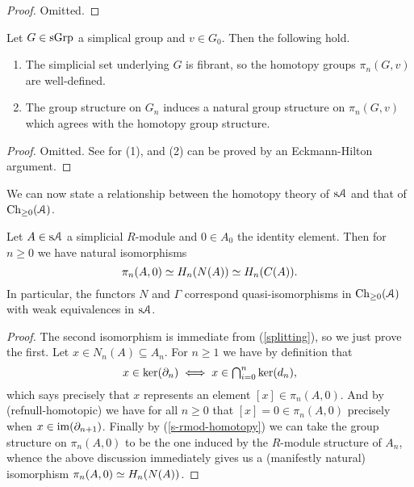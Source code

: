 \begin{proof}
  Omitted.
\end{proof}

\begin{lemma}
  \label{s-rmod-homotopy}
  Let $G \in \mathrm{s}\mathrm{Grp}$ a simplical group and $v \in G_0$. Then the
  following hold.
  \begin{enumerate}
  \item The simplicial set underlying $G$ is fibrant, so the homotopy
    groups $\pi_n(G,v)$ are well-defined.
  \item The group structure on $G_n$ induces a natural group structure
    on $\pi_n(G,v)$ which agrees with the homotopy group structure.
  \end{enumerate}
\end{lemma}

\begin{proof}
  Omitted. See \cite{goerssjardine} for (1), and (2) can be proved by
  an Eckmann-Hilton argument.
\end{proof}

We can now state a relationship between the homotopy theory of $\mathrm{s}\mathcal{A}$
and that of $\mathrm{Ch}_{\ge 0}(\mathcal{A})$.

\begin{proposition}
  \label{homotopy-homology}
  Let $A \in \mathrm{s}\mathcal{A}$ a simplicial $R$-module and $0 \in A_0$ the
  identity element. Then for $n \ge 0$ we have natural isomorphisms
  \[
  \pi_n(A,0) \simeq H_n(N(A)) \simeq H_n(C(A)).
  \]
  In particular, the functors $N$ and $\Gamma$ correspond
  quasi-isomorphisms in $\mathrm{Ch}_{\ge 0}(\mathcal{A})$ with weak equivalences in
  $\mathrm{s}\mathcal{A}$.
\end{proposition}

\begin{proof}
  The second isomorphism is immediate from (\ref{splitting}), so we
  just prove the first. Let $x \in N_n(A) \subseteq A_n$. For $n \ge
  1$ we have by definition that
  \[
  \textstyle{x \in \ker(\partial_n) \iff x \in \bigcap_{i=0}^n \ker(d_n)},
  \]
  which says precisely that $x$ represents an element $[x] \in
  \pi_n(A,0)$. And by (ref{null-homotopic}) we have for all $n \ge 0$
  that $[x] = 0 \in \pi_n(A,0)$ precisely when $x \in
  \operatorname{im}(\partial_{n+1})$. Finally by (\ref{s-rmod-homotopy}) we can take the
  group structure on $\pi_n(A,0)$ to be the one induced by the
  $R$-module structure of $A_n$, whence the above discussion
  immediately gives us a (manifestly natural) isomorphism $\pi_n(A,0)
  \simeq H_n(N(A))$.
\end{proof}

